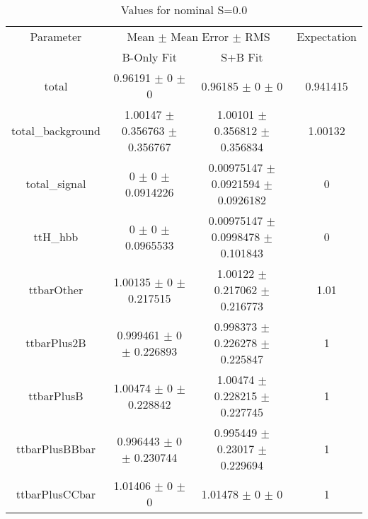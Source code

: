 \begin{table}
\centering
\caption{Values for nominal S=0.0}
\begin{tabular}{cccc}
\toprule
Parameter & \multicolumn{2}{c}{Mean $\pm$ Mean Error $\pm$ RMS} & Expectation\\
 & B-Only Fit & S+B Fit & \\
\midrule
total & \num{0.96191} $\pm$ \num{0} $\pm$ \num{0} & \num{0.96185} $\pm$ \num{0} $\pm$ \num{0} & \num{0.941415}\\
total\_background & \num{1.00147} $\pm$ \num{0.356763} $\pm$ \num{0.356767} & \num{1.00101} $\pm$ \num{0.356812} $\pm$ \num{0.356834} & \num{1.00132}\\
total\_signal & \num{0} $\pm$ \num{0} $\pm$ \num{0.0914226} & \num{0.00975147} $\pm$ \num{0.0921594} $\pm$ \num{0.0926182} & \num{0}\\
ttH\_hbb & \num{0} $\pm$ \num{0} $\pm$ \num{0.0965533} & \num{0.00975147} $\pm$ \num{0.0998478} $\pm$ \num{0.101843} & \num{0}\\
ttbarOther & \num{1.00135} $\pm$ \num{0} $\pm$ \num{0.217515} & \num{1.00122} $\pm$ \num{0.217062} $\pm$ \num{0.216773} & \num{1.01}\\
ttbarPlus2B & \num{0.999461} $\pm$ \num{0} $\pm$ \num{0.226893} & \num{0.998373} $\pm$ \num{0.226278} $\pm$ \num{0.225847} & \num{1}\\
ttbarPlusB & \num{1.00474} $\pm$ \num{0} $\pm$ \num{0.228842} & \num{1.00474} $\pm$ \num{0.228215} $\pm$ \num{0.227745} & \num{1}\\
ttbarPlusBBbar & \num{0.996443} $\pm$ \num{0} $\pm$ \num{0.230744} & \num{0.995449} $\pm$ \num{0.23017} $\pm$ \num{0.229694} & \num{1}\\
ttbarPlusCCbar & \num{1.01406} $\pm$ \num{0} $\pm$ \num{0} & \num{1.01478} $\pm$ \num{0} $\pm$ \num{0} & \num{1}\\
\bottomrule
\end{tabular}
\end{table}